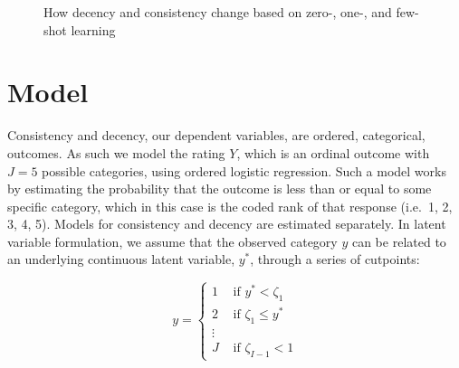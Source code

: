 \documentclass[
  letterpaper,
  DIV=11,
  numbers=noendperiod]{scrartcl}
\begin{document}
\begin{figure}

\begin{minipage}[t]{0.50\linewidth}

{\centering 


}

\end{minipage}%
%
\begin{minipage}[t]{0.50\linewidth}

{\centering 


}

\end{minipage}%

\caption{\label{fig-shot}How decency and consistency change based on
zero-, one-, and few-shot learning}

\end{figure}

\hypertarget{sec-model}{%
\section{Model}\label{sec-model}}

Consistency and decency, our dependent variables, are ordered,
categorical, outcomes. As such we model the rating \(Y\), which is an
ordinal outcome with \(J = 5\) possible categories, using ordered
logistic regression. Such a model works by estimating the probability
that the outcome is less than or equal to some specific category, which
in this case is the coded rank of that response (i.e.~1, 2, 3, 4, 5).
Models for consistency and decency are estimated separately. In latent
variable formulation, we assume that the observed category \(y\) can be
related to an underlying continuous latent variable, \(y^*\), through a
series of cutpoints:

\[
y=\left\{\begin{array}{ll}
1 & \text { if } y^*<\zeta_1 \\
2 & \text { if } \zeta_1 \leq y^* \\
\vdots & \\
J & \text { if } \zeta_{I-1}<1
\end{array}\right.
\]
\end{document}
